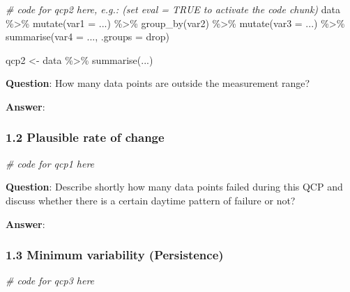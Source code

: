 \documentclass[
]{article}
\newenvironment{Shaded}{\begin{snugshade}}{\end{snugshade}}
\newcommand{\AttributeTok}[1]{\textcolor[rgb]{0.77,0.63,0.00}{#1}}
\newcommand{\CommentTok}[1]{\textcolor[rgb]{0.56,0.35,0.01}{\textit{#1}}}
\newcommand{\FunctionTok}[1]{\textcolor[rgb]{0.00,0.00,0.00}{#1}}
\newcommand{\NormalTok}[1]{#1}
\newcommand{\OtherTok}[1]{\textcolor[rgb]{0.56,0.35,0.01}{#1}}
\newcommand{\SpecialCharTok}[1]{\textcolor[rgb]{0.00,0.00,0.00}{#1}}
\newcommand{\StringTok}[1]{\textcolor[rgb]{0.31,0.60,0.02}{#1}}
\begin{document}
\begin{Shaded}
\begin{Highlighting}[]
\CommentTok{\# code for qcp2 here, e.g.: (set eval = TRUE to activate the code chunk)}
\NormalTok{data }\SpecialCharTok{\%\textgreater{}\%}
  \FunctionTok{mutate}\NormalTok{(}\AttributeTok{var1 =}\NormalTok{ ...) }\SpecialCharTok{\%\textgreater{}\%} 
  \FunctionTok{group\_by}\NormalTok{(var2) }\SpecialCharTok{\%\textgreater{}\%} 
  \FunctionTok{mutate}\NormalTok{(}\AttributeTok{var3 =}\NormalTok{ ...) }\SpecialCharTok{\%\textgreater{}\%} 
  \FunctionTok{summarise}\NormalTok{(}\AttributeTok{var4 =}\NormalTok{ ..., }\AttributeTok{.groups =} \StringTok{\textquotesingle{}drop\textquotesingle{}}\NormalTok{) }

\NormalTok{qcp2 }\OtherTok{\textless{}{-}}\NormalTok{ data }\SpecialCharTok{\%\textgreater{}\%} \FunctionTok{summarise}\NormalTok{(...)}
\end{Highlighting}
\end{Shaded}

\textbf{Question}: How many data points are outside the measurement
range?

\textbf{Answer}:

\hypertarget{plausible-rate-of-change}{%
\subsubsection{1.2 Plausible rate of
change}\label{plausible-rate-of-change}}

\begin{Shaded}
\begin{Highlighting}[]
\CommentTok{\# code for qcp1 here}
\end{Highlighting}
\end{Shaded}

\textbf{Question}: Describe shortly how many data points failed during
this QCP and discuss whether there is a certain daytime pattern of
failure or not?

\textbf{Answer}:

\hypertarget{minimum-variability-persistence}{%
\subsubsection{1.3 Minimum variability
(Persistence)}\label{minimum-variability-persistence}}

\begin{Shaded}
\begin{Highlighting}[]
\CommentTok{\# code for qcp3 here}
\end{Highlighting}
\end{Shaded}
\end{document}
